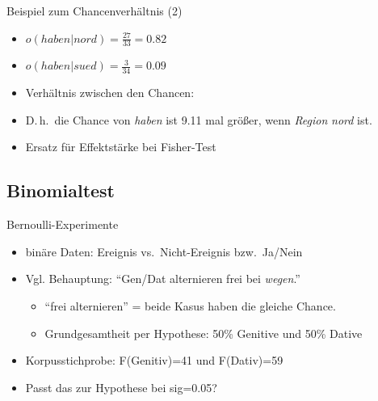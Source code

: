 \begin{frame}
  {Beispiel zum Chancenverhältnis (2)}
    \begin{center}
    \end{center}
    \begin{itemize}
      \item $o(haben|nord)=\frac{27}{33}=0.82$
      \item $o(haben|sued)=\frac{3}{34}=0.09$
	\pause\pause\pause
      \item Verhältnis zwischen den Chancen: 
	\pause\pause
      \item D.\,h.\ die Chance von \textit{haben} ist 9.11 mal größer, wenn \textit{Region} \textit{nord} ist.
	\pause
      \item Ersatz für Effektstärke bei Fisher-Test
    \end{itemize}
\end{frame}

\subsection{Binomialtest}

\begin{frame}
  {Bernoulli-Experimente}
  \begin{itemize}[<+->]
    \item binäre Daten: Ereignis vs.\ Nicht-Ereignis bzw.\ Ja\slash Nein
      \vspace{0.5cm}
    \item Vgl. Behauptung: "`Gen/Dat alternieren frei bei \textit{wegen}."'
      \begin{itemize}[<+->]
	\item "`frei alternieren"' = beide Kasus haben die gleiche Chance.
	\item Grundgesamtheit per Hypothese: \alert{50\% Genitive} und \alert{50\% Dative}
      \end{itemize}
      \vspace{0.5cm}
    \item Korpusstichprobe: \alert{F(Genitiv)=41} und \alert{F(Dativ)=59}
    \item Passt das zur Hypothese bei sig=0.05?
  \end{itemize}
\end{frame}

